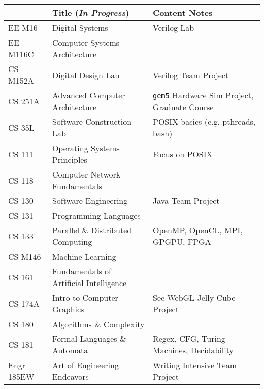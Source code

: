 \documentclass[11pt]{article}
\begin{document}
\begin{tabular}{l l l}
\hline
 & Title (\textit{In Progress}) & Content Notes \\
\hline
EE M16 & Digital Systems & Verilog Lab \\
EE M116C & Computer Systems Architecture & \\
CS M152A & Digital Design Lab & Verilog Team Project \\
CS 251A & Advanced Computer Architecture & \texttt{gem5} Hardware Sim Project, Graduate Course \\
\hline
CS 35L & Software Construction Lab & POSIX basics (e.g. pthreads, bash) \\
CS 111 & Operating Systems Principles & Focus on POSIX \\
CS 118 & Computer Network Fundamentals & \\
CS 130 & Software Engineering & Java Team Project \\
CS 131 & Programming Languages & \\
CS 133 & Parallel \& Distributed Computing & OpenMP, OpenCL, MPI, GPGPU, FPGA \\
CS M146 & Machine Learning & \\
CS 161 & Fundamentals of Artificial Intelligence & \\
CS 174A & Intro to Computer Graphics & See WebGL Jelly Cube Project \\
CS 180 & Algorithms \& Complexity & \\
CS 181 & Formal Languages \& Automata & Regex, CFG, Turing Machines, Decidability \\
\hline
Engr 185EW & Art of Engineering Endeavors & Writing Intensive Team Project \\
\hline



\end{tabular}
\end{document}
